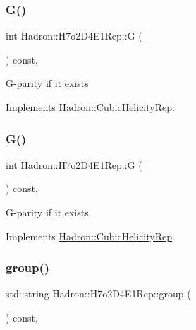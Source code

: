 \subsubsection{\texorpdfstring{G()}{G()}\hspace{0.1cm}{\footnotesize\ttfamily [1/2]}}
{\footnotesize\ttfamily int Hadron\+::\+H7o2\+D4\+E1\+Rep\+::G (\begin{DoxyParamCaption}{ }\end{DoxyParamCaption}) const\hspace{0.3cm}{\ttfamily [inline]}, {\ttfamily [virtual]}}

G-\/parity if it exists 

Implements \mbox{\hyperlink{structHadron_1_1CubicHelicityRep_a50689f42be1e6170aa8cf6ad0597018b}{Hadron\+::\+Cubic\+Helicity\+Rep}}.

\mbox{\label{structHadron_1_1H7o2D4E1Rep_af37296fd1ce6d09f1f32fdcf854c0de8}} 
\subsubsection{\texorpdfstring{G()}{G()}\hspace{0.1cm}{\footnotesize\ttfamily [2/2]}}
{\footnotesize\ttfamily int Hadron\+::\+H7o2\+D4\+E1\+Rep\+::G (\begin{DoxyParamCaption}{ }\end{DoxyParamCaption}) const\hspace{0.3cm}{\ttfamily [inline]}, {\ttfamily [virtual]}}

G-\/parity if it exists 

Implements \mbox{\hyperlink{structHadron_1_1CubicHelicityRep_a50689f42be1e6170aa8cf6ad0597018b}{Hadron\+::\+Cubic\+Helicity\+Rep}}.

\mbox{\label{structHadron_1_1H7o2D4E1Rep_ad2f4770cf61bbb361907c5347106cf14}} 
\subsubsection{\texorpdfstring{group()}{group()}\hspace{0.1cm}{\footnotesize\ttfamily [1/3]}}
{\footnotesize\ttfamily std\+::string Hadron\+::\+H7o2\+D4\+E1\+Rep\+::group (\begin{DoxyParamCaption}{ }\end{DoxyParamCaption}) const\hspace{0.3cm}{\ttfamily [inline]}, {\ttfamily [virtual]}}

